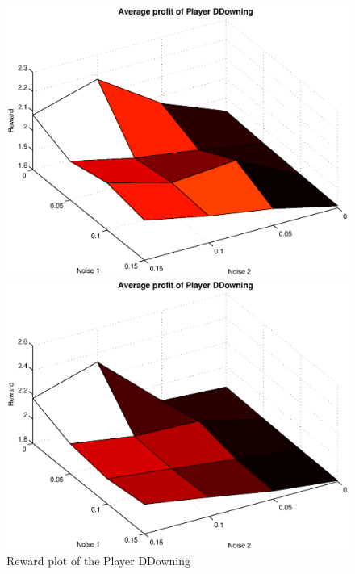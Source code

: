 \begin{figure}[h]
\begin{minipage}[hbt]{0.65\textwidth}
	\centering
	\includegraphics[width=\textwidth]{pics/simulation1/Reward_vs_Noise_of_Player_DDowning}
\end{minipage}
\hfill
\begin{minipage}[hbt]{0.3\textwidth}
	\centering
	\includegraphics[width=\textwidth]{pics/simulation2/Reward_vs_Noise_of_Player_DDowning}
\end{minipage}
	\caption{Reward plot of the Player DDowning}
	\label{pic player dd}
\end{figure}

